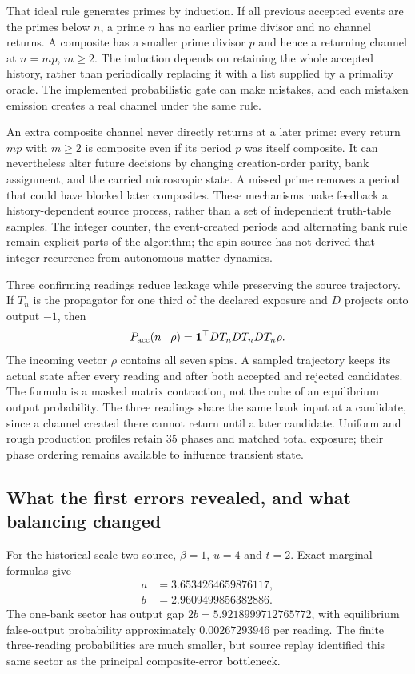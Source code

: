 That ideal rule generates primes by induction. If all previous accepted events are the primes below $n$, a prime $n$ has no earlier prime divisor and no channel returns. A composite has a smaller prime divisor $p$ and hence a returning channel at $n=mp$, $m\ge2$. The induction depends on retaining the whole accepted history, rather than periodically replacing it with a list supplied by a primality oracle. The implemented probabilistic gate can make mistakes, and each mistaken emission creates a real channel under the same rule.

An extra composite channel never directly returns at a later prime: every return $mp$ with $m\ge2$ is composite even if its period $p$ was itself composite. It can nevertheless alter future decisions by changing creation-order parity, bank assignment, and the carried microscopic state. A missed prime removes a period that could have blocked later composites. These mechanisms make feedback a history-dependent source process, rather than a set of independent truth-table samples. The integer counter, the event-created periods and alternating bank rule remain explicit parts of the algorithm; the spin source has not derived that integer recurrence from autonomous matter dynamics.

Three confirming readings reduce leakage while preserving the source trajectory. If $T_n$ is the propagator for one third of the declared exposure and $D$ projects onto output $-1$, then
\[
 P_{\rm acc}(n\mid\rho)
   =\mathbf1^\top D T_n D T_n D T_n\rho.
\]
The incoming vector $\rho$ contains all seven spins. A sampled trajectory keeps its actual state after every reading and after both accepted and rejected candidates. The formula is a masked matrix contraction, not the cube of an equilibrium output probability. The three readings share the same bank input at a candidate, since a channel created there cannot return until a later candidate. Uniform and rough production profiles retain 35 phases and matched total exposure; their phase ordering remains available to influence transient state.

\subsection{What the first errors revealed, and what balancing changed}

For the historical scale-two source, $\beta=1$, $u=4$ and $t=2$. Exact marginal formulas give
\begin{align*}
 a&=3.6534264659876117,\\
 b&=2.9609499856382886.
\end{align*}
The one-bank sector has output gap $2b=5.9218999712765772$, with equilibrium false-output probability approximately $0.00267293946$ per reading. The finite three-reading probabilities are much smaller, but source replay identified this same sector as the principal composite-error bottleneck.

